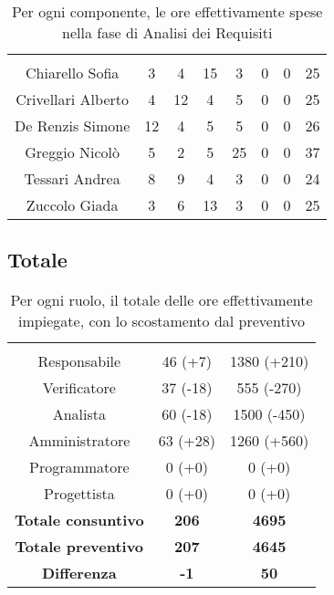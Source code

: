 \begin{table}[H]
	\begin{center}
		\begin{tabular}{c
				!{\color[HTML]{9b240a}\vrule width 1pt}
				cccccc
				!{\color[HTML]{9b240a}\vrule width 1pt}	
				c}
			\rowcolorhead
			 &  &  &  &  &  &  &  \\
			
			Chiarello Sofia & 3 & 4 & 15 & 3 & 0 & 0 & 25\\
			Crivellari Alberto & 4 & 12 & 4 & 5 & 0 & 0 & 25\\
			De Renzis Simone & 12 & 4 & 5 & 5 & 0 & 0 & 26\\
			Greggio Nicolò & 5 & 2 & 5 & 25 & 0 & 0 & 37\\
			Tessari Andrea & 8 & 9 & 4 & 3 & 0 & 0 & 24\\
			Zuccolo Giada & 3 & 6 & 13 & 3 & 0 & 0 & 25\\
		\end{tabular}
		\caption[Consuntivo fase di Analisi dei Requisiti]{Per ogni componente, le ore effettivamente spese nella fase di Analisi dei Requisiti}
	\end{center}
\end{table}



\subsection{Totale}

\begin{table}[H]
	\centering
	\begin{tabular}{ccc}
		\rowcolorhead
		\headertitle{Ruolo} & \headertitle{Ore} & \headertitle{Costo(\euro{})}\\
		Responsabile & 46 (+7) & 1380 (+210) \\
		Verificatore & 37 (-18) & 555 (-270)\\
		Analista & 60 (-18) & 1500 (-450)\\				
		Amministratore & 63 (+28) & 1260 (+560)\\
		Programmatore & 0 (+0) & 0 (+0)\\
		Progettista & 0 (+0) & 0 (+0)\\
		\hline		
		\textbf{Totale consuntivo} & \textbf{206} & \textbf{4695}\\
		\textbf{Totale preventivo} & \textbf{207} & \textbf{4645}\\
		\textbf{Differenza} & \textbf{-1} & \textbf{50}\\
	\end{tabular}
	\caption[Confronto tra preventivo e consuntivo]{Per ogni ruolo, il totale delle ore effettivamente impiegate, con lo scostamento dal preventivo}
\end{table}


